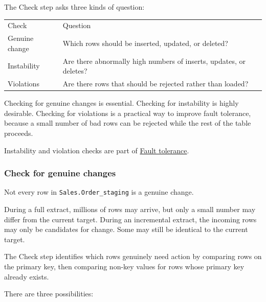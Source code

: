 \documentclass[10pt,openany,10pt]{book}
\newcounter{none}
\let\podeToprule\toprule
\let\podeMidrule\midrule
\let\podeBottomrule\bottomrule
\renewcommand{\toprule}{\arrayrulecolor{pbiGrid}\podeToprule}
\renewcommand{\midrule}{\arrayrulecolor{pbiGrid}\podeMidrule}
\renewcommand{\bottomrule}{\arrayrulecolor{pbiGrid}\podeBottomrule}
\begin{document}
The Check step asks three kinds of question:

{\def\LTcaptype{none} %
\begin{longtable}[]{@{}
  >{\raggedright\arraybackslash}p{}
  >{\raggedright\arraybackslash}p{}@{}}
\toprule\noalign{}
\begin{minipage}[b]{\linewidth}\raggedright
Check
\end{minipage} & \begin{minipage}[b]{\linewidth}\raggedright
Question
\end{minipage} \\
\midrule\noalign{}
\endhead
\bottomrule\noalign{}
\endlastfoot
Genuine change & Which rows should be inserted, updated, or deleted? \\
Instability & Are there abnormally high numbers of inserts, updates, or
deletes? \\
Violations & Are there rows that should be rejected rather than
loaded? \\
\end{longtable}
}

Checking for genuine changes is essential. Checking for instability is
highly desirable. Checking for violations is a practical way to improve
fault tolerance, because a small number of bad rows can be rejected
while the rest of the table proceeds.

Instability and violation checks are part of
\hyperref[docs-quality-reliability-fault-tolerance]{Fault tolerance}.

\subsubsection{Check for genuine
changes}\label{check-for-genuine-changes}

Not every row in \texttt{Sales.Order\_staging} is a genuine change.

During a full extract, millions of rows may arrive, but only a small
number may differ from the current target. During an incremental
extract, the incoming rows may only be candidates for change. Some may
still be identical to the current target.

The Check step identifies which rows genuinely need action by comparing
rows on the primary key, then comparing non-key values for rows whose
primary key already exists.

There are three possibilities:
\end{document}
